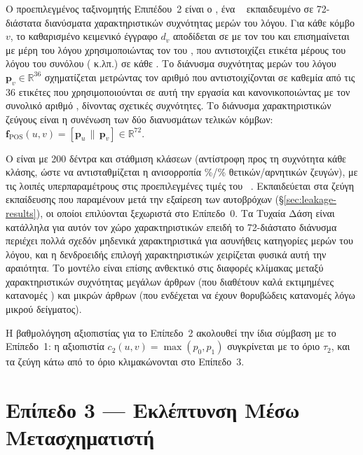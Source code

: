 Ο προεπιλεγμένος ταξινομητής Επιπέδου~2 είναι ο \texttt{}, ένα ~\cite{breiman2001random}
εκπαιδευμένο σε 72-διάστατα διανύσματα χαρακτηριστικών συχνότητας μερών του
λόγου.
Για κάθε κόμβο $v$, το καθαρισμένο κειμενικό έγγραφο $d_v$ αποδίδεται σε
 με τον  \texttt{} του  και επισημαίνεται
με μέρη του λόγου χρησιμοποιώντας τον \texttt{} του
, που αντιστοιχίζει ετικέτα μέρους του λόγου του συνόλου 
( κ.λπ.) σε κάθε .
Το διάνυσμα συχνότητας μερών του
λόγου $\mathbf{p}_v \in \mathbb{R}^{36}$ σχηματίζεται μετρώντας τον αριθμό 
που αντιστοιχίζονται σε καθεμία από τις 36 ετικέτες  που
χρησιμοποιούνται σε αυτή την εργασία και κανονικοποιώντας με τον συνολικό αριθμό
, δίνοντας σχετικές συχνότητες.
Το διάνυσμα χαρακτηριστικών ζεύγους είναι
η συνένωση των δύο διανυσμάτων τελικών κόμβων: $\mathbf{f}_{\text{POS}}(u,
v) = [\mathbf{p}_u \,\|\, \mathbf{p}_v] \in \mathbb{R}^{72}$.

Ο  είναι  με 200 δέντρα και στάθμιση κλάσεων
 (αντίστροφη προς τη συχνότητα κάθε κλάσης, ώστε να αντισταθμίζεται η
ανισορροπία \TrainPosPct\%/\TrainNegPct\% θετικών/αρνητικών ζευγών), με τις λοιπές υπερπαραμέτρους στις
προεπιλεγμένες τιμές του ~\cite{pedregosa2011scikit}.
Εκπαιδεύεται στα \TrainPairsNoSelf{} ζεύγη
εκπαίδευσης που παραμένουν μετά την εξαίρεση των \SelfLoopsTrain{} αυτοβρόχων
(\S\ref{sec:leakage-results}), οι οποίοι επιλύονται ξεχωριστά στο Επίπεδο~0.
Τα
Τυχαία Δάση είναι κατάλληλα
για αυτόν τον χώρο χαρακτηριστικών επειδή το 72-διάστατο διάνυσμα  περιέχει
πολλά σχεδόν μηδενικά χαρακτηριστικά για ασυνήθεις κατηγορίες μερών του λόγου, και
η δενδροειδής επιλογή χαρακτηριστικών χειρίζεται φυσικά αυτή την αραιότητα.
Το
μοντέλο είναι επίσης ανθεκτικό στις διαφορές κλίμακας μεταξύ χαρακτηριστικών
συχνότητας μεγάλων άρθρων (που διαθέτουν καλά εκτιμημένες κατανομές ) και
μικρών άρθρων (που ενδέχεται να έχουν θορυβώδεις κατανομές λόγω μικρού δείγματος).

Η βαθμολόγηση αξιοπιστίας για το Επίπεδο~2 ακολουθεί την ίδια σύμβαση με το
Επίπεδο~1: η αξιοπιστία $c_2(u, v) = \max(p_0, p_1)$ συγκρίνεται με το όριο $\tau_2$,
και τα ζεύγη κάτω από το όριο κλιμακώνονται στο Επίπεδο~3.


\section{Επίπεδο 3 --- Εκλέπτυνση Μέσω Μετασχηματιστή}
\label{sec:tier3}

